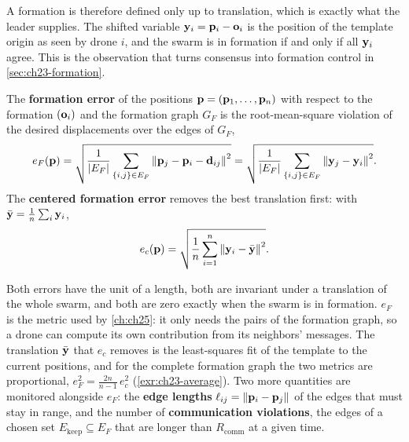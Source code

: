 A formation is therefore defined only up to translation, which is exactly what
the leader supplies. The shifted variable $\mathbf{y}_i = \mathbf{p}_i - \mathbf{o}_i$
is the position of the template origin as seen by drone $i$, and the swarm is
in formation if and only if all $\mathbf{y}_i$ agree. This is the observation
that turns consensus into formation control in \cref{sec:ch23-formation}.

\begin{definition}
\label{def:ch23-error}
The \textbf{formation error} of the positions
$\mathbf{p} = (\mathbf{p}_1, \dots, \mathbf{p}_n)$ with respect to the formation
$(\mathbf{o}_i)$ and the formation graph $G_F$ is the root-mean-square violation
of the desired displacements over the edges of $G_F$,
\begin{equation}
  e_F(\mathbf{p}) = \sqrt{\frac{1}{\left\lvert E_F \right\rvert} \sum_{\left\{ i,j \right\} \in E_F}
    \left\lVert \mathbf{p}_j - \mathbf{p}_i - \mathbf{d}_{ij} \right\rVert^2}
  = \sqrt{\frac{1}{\left\lvert E_F \right\rvert} \sum_{\left\{ i,j \right\} \in E_F}
    \left\lVert \mathbf{y}_j - \mathbf{y}_i \right\rVert^2}.
  \label{eq:ch23-error}
\end{equation}
The \textbf{centered formation error} removes the best translation first:
with $\bar{\mathbf{y}} = \frac{1}{n}\sum_i \mathbf{y}_i$,
\begin{equation}
  e_c(\mathbf{p}) = \sqrt{\frac{1}{n} \sum_{i=1}^{n} \left\lVert \mathbf{y}_i - \bar{\mathbf{y}} \right\rVert^2}.
  \label{eq:ch23-errorc}
\end{equation}
\end{definition}

Both errors have the unit of a length, both are invariant under a translation
of the whole swarm, and both are zero exactly when the swarm is in formation.
$e_F$ is the metric used by \cref{ch:ch25}: it only needs the pairs of the
formation graph, so a drone can compute its own contribution from its
neighbors' messages. The translation $\bar{\mathbf{y}}$ that $e_c$ removes is
the least-squares fit of the template to the current positions, and for the
complete formation graph the two metrics are proportional,
$e_F^2 = \frac{2n}{n-1}\, e_c^2$ (\cref{exr:ch23-average}). Two more
quantities are monitored alongside $e_F$: the \textbf{edge lengths}
$\ell_{ij} = \left\lVert \mathbf{p}_i - \mathbf{p}_j \right\rVert$ of the edges that must stay in range, and
the number of \textbf{communication violations},
the edges of a chosen set $E_{\mathrm{keep}} \subseteq E_F$ that are longer than
$R_{\mathrm{comm}}$ at a given time.

